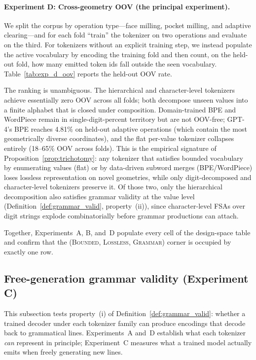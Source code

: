 \documentclass[sensors,article,submit,moreauthors,pdftex]{Definitions/mdpi}
\begin{document}
\paragraph{Experiment D: Cross-geometry OOV (the principal experiment).}
We split the corpus by operation type---face milling, pocket milling, and adaptive clearing---and for each fold ``train'' the tokenizer on two operations and evaluate on the third. For tokenizers without an explicit training step, we instead populate the active vocabulary by encoding the training fold and then count, on the held-out fold, how many emitted token ids fall outside the seen vocabulary. Table~\ref{tab:exp_d_oov} reports the held-out OOV rate.



The ranking is unambiguous. The hierarchical and character-level tokenizers achieve essentially zero OOV across all folds; both decompose unseen values into a finite alphabet that is closed under composition. Domain-trained BPE and WordPiece remain in single-digit-percent territory but are not OOV-free; GPT-4's BPE reaches 4.81\% on held-out adaptive operations (which contain the most geometrically diverse coordinates), and the flat per-value tokenizer collapses entirely (18--65\% OOV across folds). This is the empirical signature of Proposition~\ref{prop:trichotomy}: any tokenizer that satisfies bounded vocabulary by enumerating values (flat) or by data-driven subword merges (BPE/WordPiece) loses lossless representation on novel geometries, while only digit-decomposed and character-level tokenizers preserve it. Of those two, only the hierarchical decomposition also satisfies grammar validity at the value level (Definition~\ref{def:grammar_valid}, property~(ii)), since character-level FSAs over digit strings explode combinatorially before grammar productions can attach.

Together, Experiments~A, B, and~D populate every cell of the design-space table and confirm that the (\textsc{Bounded}, \textsc{Lossless}, \textsc{Grammar}) corner is occupied by exactly one row.

\subsection{Free-generation grammar validity (Experiment C)}
\label{sec:exp_c}

This subsection tests property~(i) of Definition~\ref{def:grammar_valid}: whether a trained decoder under each tokenizer family can produce encodings that decode back to grammatical lines. Experiments~A and~D establish what each tokenizer \emph{can} represent in principle; Experiment~C measures what a trained model actually emits when freely generating new lines.
\end{document}
